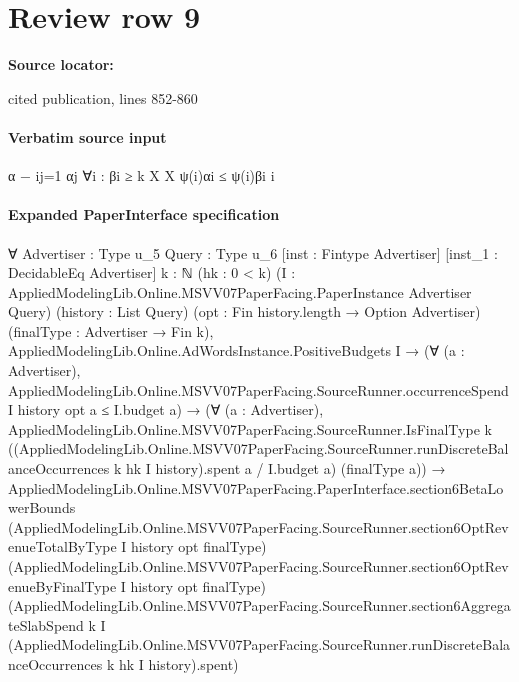 \documentclass[10pt]{article}
\begin{document}
\section*{Review row 9}
\textbf{Source locator:} {\footnotesize\raggedright cited publication, lines 852-\allowbreak{}860\par}
\paragraph{Verbatim source input}
\begin{ReviewVerbatim}
α − ij=1 αj
∀i : βi ≥
k
X
X
ψ(i)αi ≤
ψ(i)βi
i
\end{ReviewVerbatim}



\paragraph{Expanded PaperInterface specification}
\begin{ReviewVerbatim}
∀ {Advertiser : Type u_5} {Query : Type u_6} [inst : Fintype Advertiser] [inst_1 : DecidableEq Advertiser] {k : ℕ}
  (hk : 0 < k) (I : AppliedModelingLib.Online.MSVV07PaperFacing.PaperInstance Advertiser Query) (history : List Query)
  (opt : Fin history.length → Option Advertiser) (finalType : Advertiser → Fin k),
  AppliedModelingLib.Online.AdWordsInstance.PositiveBudgets I →
    (∀ (a : Advertiser),
        AppliedModelingLib.Online.MSVV07PaperFacing.SourceRunner.occurrenceSpend I history opt a ≤ I.budget a) →
      (∀ (a : Advertiser),
          AppliedModelingLib.Online.MSVV07PaperFacing.SourceRunner.IsFinalType k
            ((AppliedModelingLib.Online.MSVV07PaperFacing.SourceRunner.runDiscreteBalanceOccurrences k hk I
                    history).spent
                a /
              I.budget a)
            (finalType a)) →
        AppliedModelingLib.Online.MSVV07PaperFacing.PaperInterface.section6BetaLowerBounds
          (AppliedModelingLib.Online.MSVV07PaperFacing.SourceRunner.section6OptRevenueTotalByType I history opt
            finalType)
          (AppliedModelingLib.Online.MSVV07PaperFacing.SourceRunner.section6OptRevenueByFinalType I history opt
            finalType)
          (AppliedModelingLib.Online.MSVV07PaperFacing.SourceRunner.section6AggregateSlabSpend k I
            (AppliedModelingLib.Online.MSVV07PaperFacing.SourceRunner.runDiscreteBalanceOccurrences k hk I
                history).spent)
\end{ReviewVerbatim}
\end{document}
